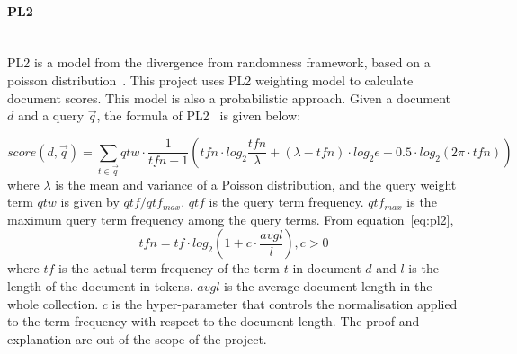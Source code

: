 \paragraph{PL2} \hspace{0pt} \\
PL2 is a model from the divergence from randomness framework, based on a poisson distribution~\cite{craig}. This project uses PL2 weighting model to 
calculate document scores. This model is also a probabilistic approach. Given a document $d$ and a query $\vec{q}$, the formula of PL2~\cite[P. 23-24]{craigthesis} is given below:

\begin{equation}\label{eq:pl2}
 score(d, \vec{q}) = \sum_{t \in \vec{q}} qtw\cdot \frac{1}{tfn + 1}(tfn\cdot log_2\frac{tfn}{\lambda} + 
 (\lambda - tfn)\cdot log_2e + 0.5\cdot log_2(2\pi \cdot tfn))
\end{equation}
where $\lambda$ is the mean and variance of a Poisson distribution, and the query weight term $qtw$ is given by $qtf/qtf_{max}$.
$qtf$ is the query term frequency. $qtf_{max}$ is the maximum query term frequency among the query terms. From equation~\ref{eq:pl2}, 
\[tfn = tf\cdot log_2(1 + c\cdot \frac{avgl}{l}), c > 0\]
where $tf$ is the actual term frequency of the term $t$ in document $d$ and $l$ is the length of the
document in tokens. $avgl$ is the average document length in the whole collection.
$c$ is the hyper-parameter that controls the normalisation applied to the term frequency
with respect to the document length.
The proof and explanation are out of the scope of the project.


